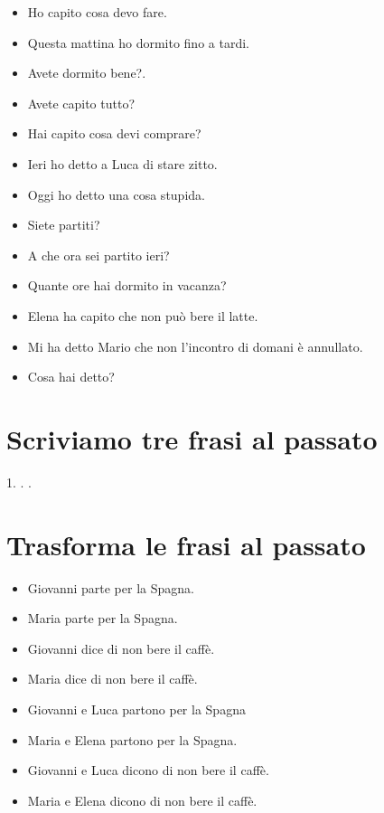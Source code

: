 \documentclass[letter,11pt]{article}
\begin{document}
\vskip 0.5in


\begin{multicols}{2}
\begin{itemize}
    \item Ho capito cosa devo fare.
    \item Questa mattina ho dormito fino a tardi.
    \item Avete dormito bene?.
    \item Avete capito tutto?
    \item Hai capito cosa devi comprare?
    \item Ieri ho detto a Luca di stare zitto.
    \item Oggi ho detto una cosa stupida.
    \item Siete partiti?
    \item A che ora sei partito ieri?
    \item Quante ore hai dormito in vacanza?
    \item Elena ha capito che non può bere il latte.
    \item Mi ha detto Mario che non l'incontro di domani è annullato.
    \item Cosa hai detto?

\end{itemize}
\end{multicols}

\vskip 0.2in
\section*{Scriviamo tre frasi al passato}
\vskip 0.2in

1. \hrulefill
\vskip 0.2in
. \hrulefill
\vskip 0.2in
. \hrulefill
\vskip 0.5in

\vskip 0.2in
\section*{Trasforma le frasi al passato}
\vskip 0.2in

\begin{multicols}{2}
\begin{itemize}

    \item Giovanni parte per la Spagna.
    \item Maria parte per la Spagna.
    \item Giovanni dice di non bere il caffè.
    \item Maria dice di non bere il caffè.
    \item Giovanni e Luca partono per la Spagna
    \item Maria e Elena partono per la Spagna.
    \item Giovanni e Luca dicono di non bere il caffè.
    \item Maria e Elena dicono di non bere il caffè.

\end{itemize}
\end{multicols}
\vskip 0.2in
\end{document}

